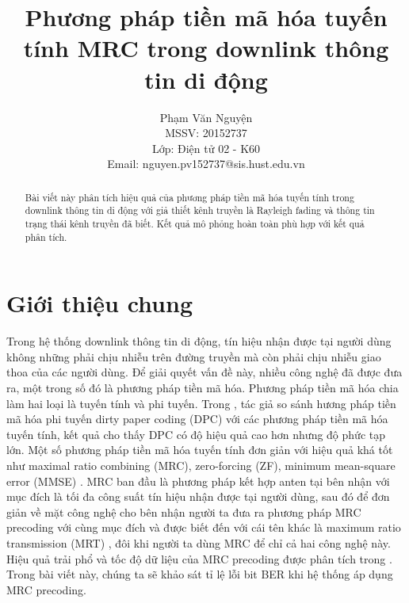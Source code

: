 \documentclass[conference]{IEEEtran}
\begin{document}
	\title{Phương pháp tiền mã hóa tuyến tính MRC trong downlink thông tin di động}
	\author{Phạm Văn Nguyện\\
		MSSV: 20152737\\
		Lớp: Điện tử 02 - K60\\
		Email: nguyen.pv152737@sis.hust.edu.vn}
	\maketitle
	\begin{abstract}
		Bài viết này phân tích hiệu quả của phương pháp tiền mã hóa tuyến tính trong downlink thông tin di động với giả thiết kênh truyền là Rayleigh fading và thông tin trạng thái kênh truyền đã biết. Kết quả mô phỏng hoàn toàn phù hợp với kết quả phân tích.
	\end{abstract}
	\section{Giới thiệu chung}
	Trong hệ thống downlink thông tin di động, tín hiệu nhận được tại người dùng không những phải chịu nhiễu trên đường truyền mà còn phải chịu nhiễu giao thoa của các người dùng. Để giải quyết vấn đề này, nhiều công nghệ đã được đưa ra, một trong số đó là phương pháp tiền mã hóa. Phương pháp tiền mã hóa chia làm hai loại là tuyến tính và phi tuyến. Trong \cite{art3}, tác giả so sánh hương pháp tiền mã hóa phi tuyến dirty paper coding (DPC) với các phương pháp tiền mã hóa tuyến tính, kết quả cho thấy DPC có độ hiệu quả cao hơn nhưng độ phức tạp lớn. Một số phương pháp tiền mã hóa tuyến tính đơn giản với hiệu quả khá tốt như maximal ratio combining (MRC), zero-forcing (ZF), minimum mean-square error (MMSE) \cite{art2}. MRC ban đầu là phương pháp kết hợp anten tại bên nhận \cite{art5} với mục đích là tối đa công suất tín hiệu nhận được tại người dùng, sau đó để đơn giản về mặt công nghệ cho bên nhận người ta đưa ra phương pháp MRC precoding với cùng mục đích và được biết đến với cái tên khác là maximum ratio transmission (MRT)  \cite{art1}, đôi khi người ta dùng MRC để chỉ cả hai công nghệ này. Hiệu quả trải phổ và tốc độ dữ liệu của MRC precoding được phân tích trong \cite{art2}. Trong bài viết này, chúng ta sẽ khảo sát tỉ lệ lỗi bit BER khi hệ thống áp dụng MRC precoding. 
\end{document}

